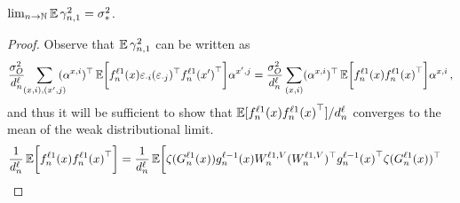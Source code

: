 \begin{lemma}\label{lem:head_var_convergence}
    $\lim_{n \to \mathbb{N}} \operatorname*{\mathbb{E}} \gamma_{n , 1}^2 = \sigma^2_{*}$.
\end{lemma}

\begin{proof}
    Observe that $\operatorname*{\mathbb{E}} \gamma_{n , 1}^2$ can be written as
    \begin{align*}
        \frac{\sigma_{O}^2}{d_{n}^{\ell}}
        \! \!
        \sum_{(x, i), (x', j)}
        \! \! \! \!
        (\alpha^{x, i})^\top
        \operatorname*{\mathbb{E}} \biggl[
            {f}^{\ell 1}_{n}{(x)}
            \varepsilon_{\cdot i}
            (\varepsilon_{\cdot j})^\top
            {f}^{\ell 1}_{n}{(x')}^\top
        \biggr]
        \alpha^{x', j}
        =
        \frac{\sigma_{O}^2}{d_{n}^{\ell}}
        \sum_{(x, i)}
        (\alpha^{x, i})^\top
        \operatorname*{\mathbb{E}} \biggl[
            {f}^{\ell 1}_{n}{(x)}
            {f}^{\ell 1}_{n}{(x)}^\top
        \biggr]
        \alpha^{x, i}
        \, ,
    \end{align*}
    and thus it will be sufficient to show that $\operatorname*{\mathbb{E}} [ {f}^{\ell 1}_{n}{(x)}  {f}^{\ell 1}_{n}{(x)}^\top ] / d_{n}^{\ell}$ 
    converges to the mean of the weak distributional limit.
    \begin{align*}
        \frac{1}{\layerDimensionN}
        \E \biggl[
            \indexedActivation{\depthSymbol 1}{\sequenceVariable}{\inputSymbol}
            \indexedActivation{\depthSymbol 1}{\sequenceVariable}{\inputSymbol}^\top
        \biggr]
        &=
        \frac{1}{\layerDimensionN}
        \E \biggl[
            \softmax(\logitSymbol_{\sequenceVariable}^{\depthSymbol 1} (\inputSymbol))
            \indexedActivity{\depthSymbol - 1}{\sequenceVariable}{\inputSymbol}
            \weightMatSymbol_{\sequenceVariable}^{\depthSymbol 1 , \valueSymbol}
            (\weightMatSymbol_{\sequenceVariable}^{\depthSymbol 1 , \valueSymbol})^\top
            \indexedActivity{\depthSymbol - 1}{\sequenceVariable}{\inputSymbol}^\top
            \softmax(\logitSymbol_{\sequenceVariable}^{\depthSymbol 1} (\inputSymbol))^\top

\end{align*}
\end{proof}
